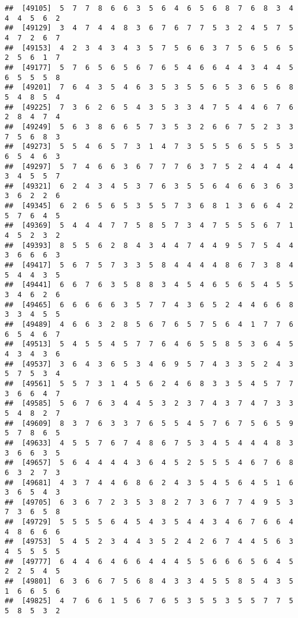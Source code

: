 \documentclass[
]{book}
\begin{document}
\begin{verbatim}
##  [49105]  5  7  7  8  6  6  3  5  6  4  6  5  6  8  7  6  8  3  4  4  4  5  6  2
##  [49129]  3  4  7  4  4  8  3  6  7  6  7  7  5  3  2  4  5  7  5  4  7  2  6  7
##  [49153]  4  2  3  4  3  4  3  5  7  5  6  6  3  7  5  6  5  6  5  2  5  6  1  7
##  [49177]  5  7  6  5  6  5  6  7  6  5  4  6  6  4  4  3  4  4  5  6  5  5  5  8
##  [49201]  7  6  4  3  5  4  6  3  5  3  5  5  6  5  3  6  5  6  8  5  4  8  5  4
##  [49225]  7  3  6  2  6  5  4  3  5  3  3  4  7  5  4  4  6  7  6  2  8  4  7  4
##  [49249]  5  6  3  8  6  6  5  7  3  5  3  2  6  6  7  5  2  3  3  7  5  6  8  3
##  [49273]  5  5  4  6  5  7  3  1  4  7  3  5  5  5  6  5  5  5  3  6  5  4  6  3
##  [49297]  5  7  4  6  6  3  6  7  7  7  6  3  7  5  2  4  4  4  4  3  4  5  5  7
##  [49321]  6  2  4  3  4  5  3  7  6  3  5  5  6  4  6  6  3  6  3  3  6  2  2  6
##  [49345]  6  2  6  5  6  5  3  5  5  7  3  6  8  1  3  6  6  4  2  5  7  6  4  5
##  [49369]  5  4  4  4  7  7  5  8  5  7  3  4  7  5  5  5  6  7  1  4  5  2  3  2
##  [49393]  8  5  5  6  2  8  4  3  4  4  7  4  4  9  5  7  5  4  4  3  6  6  6  3
##  [49417]  5  6  7  5  7  3  3  5  8  4  4  4  4  8  6  7  3  8  4  5  4  4  3  5
##  [49441]  6  6  7  6  3  5  8  8  3  4  5  4  6  5  6  5  4  5  5  3  4  6  2  6
##  [49465]  6  6  6  6  6  3  5  7  7  4  3  6  5  2  4  4  6  6  8  3  3  4  5  5
##  [49489]  4  6  6  3  2  8  5  6  7  6  5  7  5  6  4  1  7  7  6  6  5  4  6  7
##  [49513]  5  4  5  5  4  5  7  7  6  4  6  5  5  8  5  3  6  4  5  4  3  4  3  6
##  [49537]  3  6  4  3  6  5  3  4  6  9  5  7  4  3  3  5  2  4  3  5  7  5  3  4
##  [49561]  5  5  7  3  1  4  5  6  2  4  6  8  3  3  5  4  5  7  7  3  6  6  4  7
##  [49585]  5  6  7  6  3  4  4  5  3  2  3  7  4  3  7  4  7  3  3  5  4  8  2  7
##  [49609]  8  3  7  6  3  3  7  6  5  5  4  5  7  6  7  5  6  5  9  5  7  8  6  5
##  [49633]  4  5  5  7  6  7  4  8  6  7  5  3  4  5  4  4  4  8  3  3  6  6  3  5
##  [49657]  5  6  4  4  4  4  3  6  4  5  2  5  5  5  4  6  7  6  8  6  3  2  7  3
##  [49681]  4  3  7  4  4  6  8  6  2  4  3  5  4  5  6  4  5  1  6  3  6  5  4  3
##  [49705]  6  3  6  7  2  3  5  3  8  2  7  3  6  7  7  4  9  5  3  7  3  6  5  8
##  [49729]  5  5  5  5  6  4  5  4  3  5  4  4  3  4  6  7  6  6  4  4  8  6  6  6
##  [49753]  5  4  5  2  3  4  4  3  5  2  4  2  6  7  4  4  5  6  3  4  5  5  5  5
##  [49777]  6  4  4  6  4  6  6  4  4  4  5  5  6  6  6  5  6  4  5  2  2  5  4  5
##  [49801]  6  3  6  6  7  5  6  8  4  3  3  4  5  5  8  5  4  3  5  1  6  6  5  6
##  [49825]  4  7  6  6  1  5  6  7  6  5  3  5  5  3  5  5  7  7  5  5  8  5  3  2

\end{verbatim}
\end{document}
